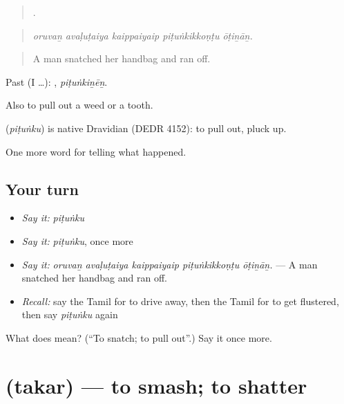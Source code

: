 \begin{quote}
    .
\end{quote}

\begin{quote}
\emph{oruvaṉ avaḷuṭaiya kaippaiyaip piṭuṅkikkoṇṭu ōṭiṉāṉ.}
\end{quote}

\begin{quote}
A man snatched her handbag and ran off.
\end{quote}

Past (I …): , \emph{piṭuṅkiṉēṉ}.

Also to pull out a weed or a tooth.

\begin{cousinweb}
\textbf{} (\emph{piṭuṅku}) is native Dravidian (DEDR 4152): to pull out, pluck up.
\end{cousinweb}

\begin{grammarlens}[title={What you've built}]
One more word for telling what happened.
\end{grammarlens}

\subsection*{Your turn}
\begin{itemize}
\raggedright
  \item \emph{Say it:} \emph{piṭuṅku}
  \item \emph{Say it:} \emph{piṭuṅku}, once more
  \item \emph{Say it:} \emph{oruvaṉ avaḷuṭaiya kaippaiyaip piṭuṅkikkoṇṭu ōṭiṉāṉ.} — A man snatched her handbag and ran off.
  \item \emph{Recall:} say the Tamil for to drive away, then the Tamil for to get flustered, then say \emph{piṭuṅku} again
\end{itemize}

\begin{tcolorbox}[breakable,colback=teal!4,colframe=teal!35!black,title={Before you move on}]
What does  mean? (\textquotedblleft{}To snatch; to pull out\textquotedblright{}.) Say it once more.
\end{tcolorbox}
\section[\texorpdfstring{\ta{தகர்} (takar)}{தகர் (takar)}]{ (takar) — to smash; to shatter}

